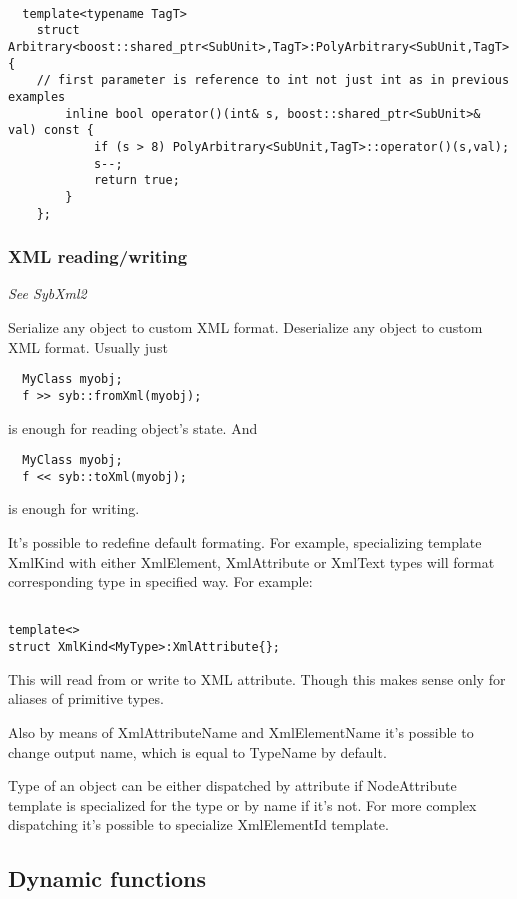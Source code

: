 \documentclass[a4paper]{article}
\begin{document}
\begin{lstlisting}

  template<typename TagT>
	struct Arbitrary<boost::shared_ptr<SubUnit>,TagT>:PolyArbitrary<SubUnit,TagT> {
    // first parameter is reference to int not just int as in previous examples
		inline bool operator()(int& s, boost::shared_ptr<SubUnit>& val) const {
			if (s > 8) PolyArbitrary<SubUnit,TagT>::operator()(s,val); 
			s--;
			return true;
		}
	};

\end{lstlisting}

\subsubsection{XML reading/writing}

\emph{See SybXml2}

Serialize any object to custom XML format.
Deserialize any object to custom XML format. Usually just
\begin{lstlisting}
  MyClass myobj;
  f >> syb::fromXml(myobj);
\end{lstlisting}
is enough for reading object's state. And 
\begin{lstlisting}
  MyClass myobj;
  f << syb::toXml(myobj);
\end{lstlisting}
is enough for writing.

It's possible to redefine default formating. For example, specializing 
template XmlKind with either XmlElement, XmlAttribute or XmlText types will
format corresponding type in specified way. For example:
\begin{lstlisting}

template<>
struct XmlKind<MyType>:XmlAttribute{};

\end{lstlisting}

This will read from or write to XML attribute. Though this makes sense only for aliases
of primitive types.

Also by means of XmlAttributeName and XmlElementName it's possible to change output
name, which is equal to TypeName by default. 

Type of an object can be either dispatched by attribute if NodeAttribute template
is specialized for the type or by name if it's not. For more complex dispatching it's possible
to specialize XmlElementId template.

\subsection{Dynamic functions}
\end{document}
